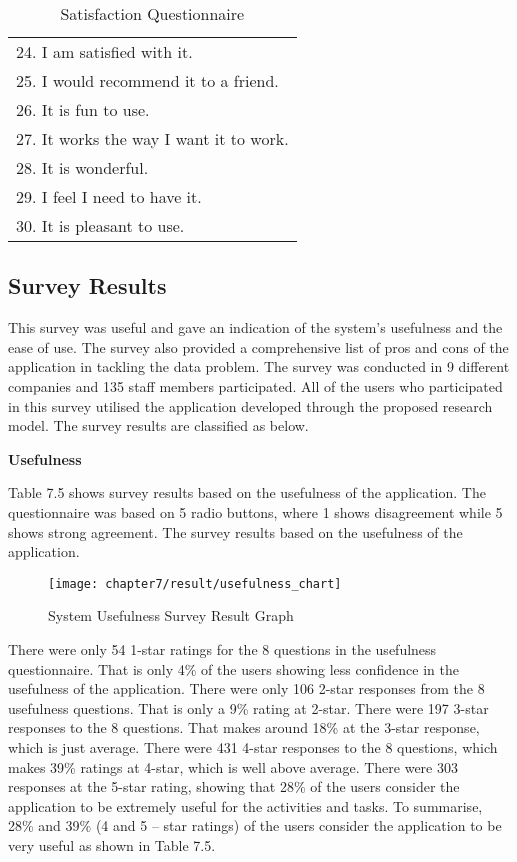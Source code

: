 \begin{table}
\begin{center}
\begin{tabular}{ |l| } 
 \hline
24.	I am satisfied with it.\\
25.	I would recommend it to a friend.\\
26.	It is fun to use.\\
27.	It works the way I want it to work.\\
28.	It is wonderful.\\
29.	I feel I need to have it.\\
30.	It is pleasant to use.\\
 \hline
 \end{tabular}
 \caption{Satisfaction Questionnaire}
\label{table:4}
\end{center}
\end{table}

\subsection {Survey Results}

This survey was useful and gave an indication of the system’s usefulness and the ease of use. The survey also provided a comprehensive list of pros and cons of the application in tackling the data problem. The survey was conducted in 9 different companies and 135 staff members participated. All of the users who participated in this survey utilised the application developed through the proposed research model. The survey results are classified as below.

\textbf{Usefulness}

Table 7.5 shows survey results based on the usefulness of the application. The questionnaire was based on 5 radio buttons, where 1 shows disagreement while 5 shows strong agreement. The survey results based on the usefulness of the application.\\

\begin{figure}
\centering
\texttt{[image: chapter7/result/usefulness\_chart]}
\caption{System Usefulness Survey Result Graph}
\end{figure}

There were only 54 1-star ratings for the 8 questions in the usefulness questionnaire. That is only 4\% of the users showing less confidence in the usefulness of the application. There were only 106 2-star responses from the 8 usefulness questions. That is only a 9\% rating at 2-star. There were 197 3-star responses to the 8 questions. That makes around 18\% at the 3-star response, which is just average. There were 431 4-star responses to the 8 questions, which makes 39\% ratings at 4-star, which is well above average. There were 303 responses at the 5-star rating, showing that 28\% of the users consider the application to be extremely useful for the activities and tasks. To summarise, 28\% and 39\% (4 and 5 – star ratings) of the users consider the application to be very useful as shown in Table 7.5. 

